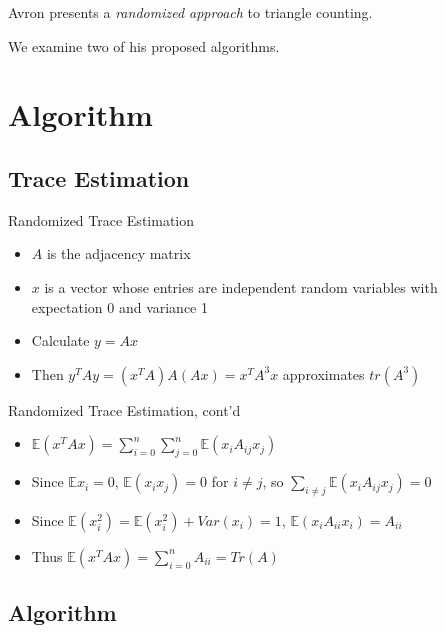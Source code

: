 \documentclass{beamer}
\begin{document}
\begin{frame}
    Avron presents a \textit{randomized approach} to triangle counting.
    
    We examine two of his proposed algorithms.
\end{frame}

\section{Algorithm}

\subsection{Trace Estimation}

\begin{frame}{Randomized Trace Estimation}
\begin{itemize}
    \item $A$ is the adjacency matrix
    \item $x$ is a vector whose entries are independent random variables with expectation 0 and variance 1
    \item Calculate $y=Ax$
    \item Then $y^T A y = (x^T A) A (Ax) = x^T A^3 x$ approximates $tr(A^3)$
    
\end{itemize}
\end{frame}

\begin{frame}{Randomized Trace Estimation, cont'd}
\begin{itemize}
    \item $\mathbb E (x^T A x) = \sum_{i=0}^n \sum_{j=0}^n \mathbb E (x_i A_{ij} x_j)$
    \item Since $\mathbb E x_i = 0$, $\mathbb E (x_i x_j) = 0$ for $i\neq j$, so $\sum_{i\neq j} \mathbb E(x_i A_{ij} x_j) = 0$
    \item Since $\mathbb E (x_i^2) = \mathbb E(x_i^2) + Var(x_i) = 1$, $\mathbb E(x_i A_{ii} x_i) = A_{ii}$
    \item Thus $\mathbb E (x^T A x) = \sum_{i=0}^n A_{ii} = Tr(A)$
\end{itemize}
    
\end{frame}

\subsection{Algorithm}
\end{document}
